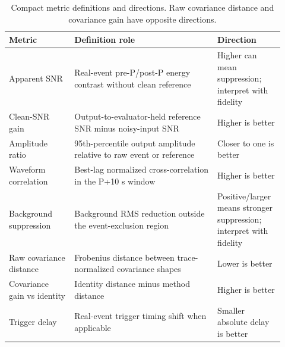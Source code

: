 \documentclass[review,12pt,authoryear]{elsarticle}
\begin{document}
\begin{table}[!htbp]
\centering
\caption{Compact metric definitions and directions. Raw covariance distance and covariance gain have opposite directions.}
\label{tab:metric_definitions_compact}
\scriptsize
\begin{tabularx}{\linewidth}{@{}>{\raggedright\arraybackslash}p{0.22\linewidth}>{\raggedright\arraybackslash}p{0.48\linewidth}>{\raggedright\arraybackslash}p{0.22\linewidth}@{}}
\toprule
Metric & Definition role & Direction \\
\midrule
Apparent SNR & Real-event pre-P/post-P energy contrast without clean reference & Higher can mean suppression; interpret with fidelity \\
Clean-SNR gain & Output-to-evaluator-held reference SNR minus noisy-input SNR & Higher is better \\
Amplitude ratio & 95th-percentile output amplitude relative to raw event or reference & Closer to one is better \\
Waveform correlation & Best-lag normalized cross-correlation in the P+10 s window & Higher is better \\
Background suppression & Background RMS reduction outside the event-exclusion region & Positive/larger means stronger suppression; interpret with fidelity \\
Raw covariance distance & Frobenius distance between trace-normalized covariance shapes & Lower is better \\
Covariance gain vs identity & Identity distance minus method distance & Higher is better \\
Trigger delay & Real-event trigger timing shift when applicable & Smaller absolute delay is better \\
\bottomrule
\end{tabularx}
\end{table}
\end{document}
